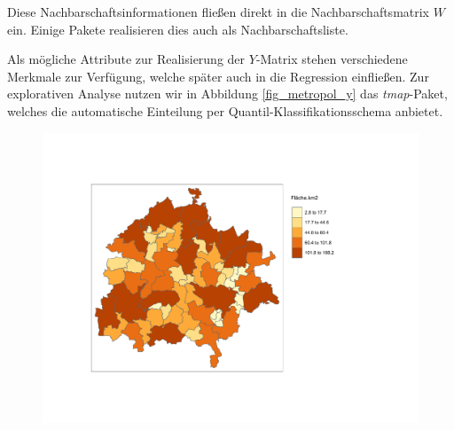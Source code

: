 Diese Nachbarschaftsinformationen fließen direkt in die Nachbarschaftsmatrix $W$ ein.
Einige Pakete realisieren dies auch als Nachbarschaftsliste. 

Als mögliche Attribute zur Realisierung der $Y$-Matrix stehen verschiedene Merkmale zur 
Verfügung, welche später auch in die Regression einfließen. Zur explorativen Analyse 
nutzen wir in Abbildung \ref{fig_metropol_y} das \emph{tmap}-Paket, welches die automatische Einteilung 
per Quantil-Klassifikationsschema anbietet.


\begin{figure} %
    \centering %
    \begin{minipage}[b]{.45\linewidth} %
       \includegraphics[scale=0.4,trim={1cm 2cm 1cm 2cm},clip]{body/figures/km2.pdf} %
    \end{minipage} %
    \hfill
    \begin{minipage}[b]{.45\linewidth}

\end{minipage}
\end{figure}
